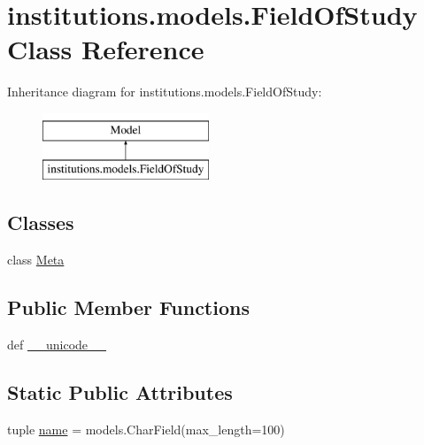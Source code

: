 \hypertarget{classinstitutions_1_1models_1_1_field_of_study}{\section{institutions.\-models.\-Field\-Of\-Study Class Reference}
\label{classinstitutions_1_1models_1_1_field_of_study}
}
Inheritance diagram for institutions.\-models.\-Field\-Of\-Study\-:\begin{figure}[H]
\begin{center}
\leavevmode
\includegraphics[height=2.000000cm]{classinstitutions_1_1models_1_1_field_of_study}
\end{center}
\end{figure}
\subsection*{Classes}
\begin{DoxyCompactItemize}
\item 
class \hyperlink{classinstitutions_1_1models_1_1_field_of_study_1_1_meta}{Meta}
\end{DoxyCompactItemize}
\subsection*{Public Member Functions}
\begin{DoxyCompactItemize}
\item 
def \hyperlink{classinstitutions_1_1models_1_1_field_of_study_a155c669fccdfefaf296d141172fe8ee2}{\-\_\-\-\_\-unicode\-\_\-\-\_\-}
\end{DoxyCompactItemize}
\subsection*{Static Public Attributes}
\begin{DoxyCompactItemize}
\item 
tuple \hyperlink{classinstitutions_1_1models_1_1_field_of_study_ae9f06655cdd3585c9768d191284e3ba8}{name} = models.\-Char\-Field(max\-\_\-length=100)
\end{DoxyCompactItemize}



